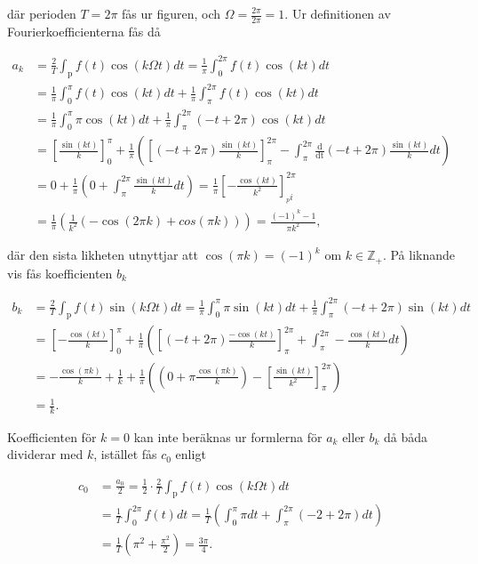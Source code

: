 \documentclass[a4paper]{article}
\begin{document}
\noindent där perioden $T = 2\pi$ fås ur figuren, och $\Omega =
\frac{2\pi}{2\pi} = 1$. Ur definitionen av Fourierkoefficienterna fås då

\setlength{\jot}{10pt}
\begin{align*}
  a_k &= \frac{2}{T}\int_{\text{p}}f(t)\cos(k\Omega t) dt = \frac{1}{\pi}\int_0^{2\pi}f(t)\cos(kt)dt\\
      &= \frac{1}{\pi}\int_0^{\pi}f(t)\cos(kt)dt + \frac{1}{\pi}\int_{\pi}^{2\pi}f(t)\cos(kt)dt\\
      &= \frac{1}{\pi}\int_0^{\pi}\pi\cos(kt)dt + \frac{1}{\pi}\int_{\pi}^{2\pi}(-t + 2\pi)\cos(kt)dt\\
      & = \left[ \frac{\sin(kt)}{k} \right]_0^{\pi} + \frac{1}{\pi}\left( \left[ (-t + 2\pi)\frac{\sin(kt)}{k} \right]_{\pi}^{2\pi} - \int_{\pi}^{2\pi}\frac{\text{d}}{\text{dt}}(-t + 2\pi)\frac{\sin(kt)}{k}dt \right)\\
      &= 0 + \frac{1}{\pi}\left( 0 + \int_{\pi}^{2\pi}\frac{\sin(kt)}{k}dt \right) = \frac{1}{\pi}\left[ -\frac{\cos(kt)}{k^2} \right]_{_pi}^{2\pi}\\
  &= \frac{1}{\pi}\left( \frac{1}{k^2}(-\cos(2\pi k) + cos(\pi k)) \right) = \frac{(-1)^k - 1}{\pi k^2},
\end{align*}

\noindent där den sista likheten utnyttjar att $\cos(\pi k) = (-1)^k$ om $k \in
\mathbb{Z}_+$. På liknande vis fås koefficienten $b_k$

\begin{align*}
  b_k &= \frac{2}{T}\int_{\text{p}}f(t)\sin(k\Omega t)dt = \frac{1}{\pi}\int_0^{\pi}\pi\sin(kt)dt + \frac{1}{\pi}\int_{\pi}^{2\pi}(-t + 2\pi)\sin(kt)dt\\
      &= \left[ -\frac{\cos(kt)}{k} \right]_0^{\pi} + \frac{1}{\pi}\left( \left[ (-t+2\pi)\frac{-\cos(kt)}{k} \right]_{\pi}^{2\pi} + \int_{\pi}^{2\pi}-\frac{\cos(kt)}{k}dt \right)\\
      &= -\frac{\cos(\pi k)}{k} + \frac{1}{k} + \frac{1}{\pi}\left( \left( 0 + \pi\frac{\cos(\pi k)}{k} \right) - \left[ \frac{\sin(kt)}{k^2} \right]_{\pi}^{2\pi} \right)\\
  &= \frac{1}{k}.
\end{align*}

\noindent Koefficienten för $k = 0$ kan inte beräknas ur formlerna för $a_k$
eller $b_k$ då båda dividerar med $k$, istället fås $c_0$ enligt

\begin{align*}
  c_0 &= \frac{a_0}{2} = \frac 12 \cdot \frac 2T \int_{\text{p}}f(t)\cos(k\Omega t)dt\\
  &= \frac 1T \int_0^{2\pi}f(t)dt = \frac 1T \left( \int_0^{\pi}\pi dt + \int_\pi^{2\pi}(-2 + 2\pi) dt \right)\\
  &= \frac 1T \left( \pi^2 + \frac{\pi^2}{2} \right) = \frac{3\pi}{4}.
\end{align*}
\end{document}
